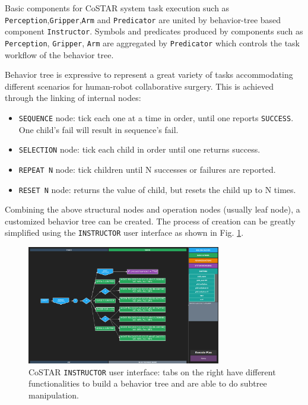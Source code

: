 \documentclass[letterpaper, 10 pt, conference]{ieeeconf}
\begin{document}
Basic components for CoSTAR system task execution such as \texttt{Perception},\texttt{Gripper},\texttt{Arm} and \texttt{Predicator} are united by behavior-tree based component \texttt{Instructor}. Symbols and predicates produced by components such as \texttt{Perception}, \texttt{Gripper}, \texttt{Arm} are aggregated by \texttt{Predicator} which controls the task workflow of the behavior tree. 

Behavior tree is expressive to represent a great variety of tasks accommodating different scenarios for human-robot collaborative surgery. This is achieved through the linking of internal nodes:
 
\begin{itemize}
\item \texttt{SEQUENCE} node: tick each one at a time in order, until one reports \texttt{SUCCESS}. One child's fail will result in sequence's fail.
\item \texttt{SELECTION} node: tick each child in order until one returns success.
\item \texttt{REPEAT N} node: tick children until N successes or failures are reported.
\item \texttt{RESET N} node: returns the value of child, but resets the child up to N times.
\end{itemize} 

Combining the above structural nodes and operation nodes (usually leaf node), a customized behavior tree can be created. The process of creation can be greatly simplified using the \texttt{INSTRUCTOR} user interface as shown in Fig. \ref{fig:instructor}.

\begin{figure}[bt]
\centering
\includegraphics[width=240pt]{instructor.png}
\caption{CoSTAR \texttt{INSTRUCTOR} user interface: tabs on the right have different functionalities to build a behavior tree and are able to do subtree manipulation. }
\label{fig:instructor}
\end{figure}
\end{document}
